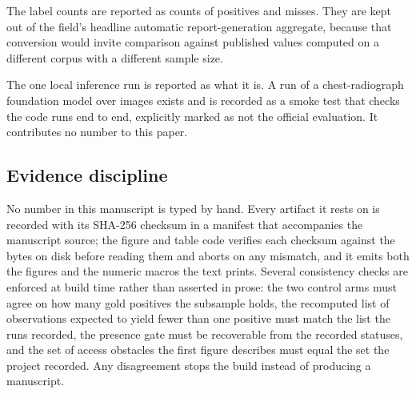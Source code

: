 The label counts are reported as counts of positives and misses. They are kept
out of the field's headline automatic report-generation aggregate, because
that conversion would invite comparison against published values computed on a
different corpus with a different sample size.

The one local inference run is reported as what it is. A run of a
chest-radiograph foundation model over \HarnessImages{} images exists and is
recorded as a smoke test that checks the code runs end to end, explicitly
marked as not the official evaluation. It contributes no number to this paper.

\subsection{Evidence discipline}

No number in this manuscript is typed by hand. Every artifact it rests on is
recorded with its SHA-256 checksum in a manifest that accompanies the manuscript
source; the figure and table code verifies each checksum against the bytes on disk
before reading them and aborts on any mismatch, and it emits both the figures and
the numeric macros the text prints. Several consistency checks are enforced at
build time rather than asserted in prose: the two control arms must agree on how
many gold positives the subsample holds, the recomputed list of observations
expected to yield fewer than one positive must match the list the runs recorded,
the presence gate must be recoverable from the recorded statuses, and the set of
access obstacles the first figure describes must equal the set the project
recorded. Any disagreement stops the build instead of producing a manuscript.
